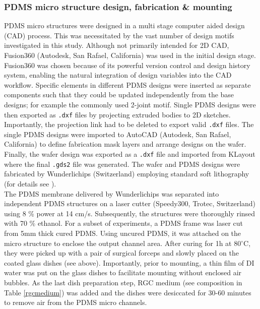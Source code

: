 \subsubsection{PDMS micro structure design, fabrication \& mounting}
\label{pdms structures assembly}
PDMS micro structures were designed in a multi stage computer aided design (CAD)
process. This was necessitated by the vast number of design motifs investigated
in this study. Although not primarily intended for 2D CAD, Fusion360 (Autodesk,
San Rafael, California) was used in the initial design stage. Fusion360 was
chosen because of its powerful version control and design history system,
enabling the natural integration of design variables into the CAD workflow.
Specific elements in different PDMS designs were inserted as separate components
such that they could be updated independently from the base designs; for example
the commonly used 2-joint motif. Single PDMS designs were then exported as
\verb|.dxf| files by projecting extruded bodies to 2D sketches. Importantly, the
projection link had to be deleted to export valid \verb|.dxf| files. The single
PDMS designs were imported to AutoCAD (Autodesk, San Rafael, California) to
define fabrication mask layers and arrange designs on the wafer. Finally, the
wafer design was exported as a \verb|.dxf| file and imported from KLayout where
the final \verb|.gds2| file was generated. The wafer and PDMS designs were
fabricated by Wunderlichips (Switzerland) employing standard soft lithography
(for details see \cite{forro}). \\

The PDMS membrane delivered by Wunderlichips was separated into independent PDMS
structures on a laser cutter (Speedy300, Trotec, Switzerland) using 8 \% power
at 14 cm/s. Subsequently, the structures were thoroughly rinsed with 70 \%
ethanol. For a subset of experiments, a PDMS frame was laser cut from 5mm thick
cured PDMS. Using uncured PDMS, it was attached on the micro structure to
enclose the output channel area. After curing for 1h at 80$^{\circ}$C, they were
picked up with a pair of surgical forceps and slowly placed on the coated glass
dishes (see above). Importantly, prior to mounting, a thin film of DI water was
put on the glass dishes to facilitate mounting without enclosed air bubbles. As
the last dish preparation step, RGC medium (see composition in Table
\ref{rgcmedium}) was added and the dishes were desiccated for 30-60 minutes to
remove air from the PDMS micro channels.

